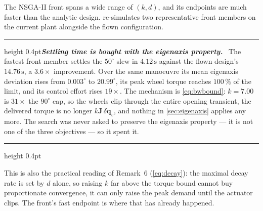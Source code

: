 \documentclass[conference,10pt,a4paper]{IEEEtran}
\newcommand{\remarkrule}{\par\nobreak\vspace{2pt}%
  \hrule height 0.4pt\vspace{4pt}\nobreak}
\newenvironment{keybox}[1][Result]
  {\par\medskip\remarkrule\noindent\small\textbf{\textit{#1.}}\ \ignorespaces}
  {\par\vspace{3pt}\hrule height 0.4pt\par\medskip\ignorespacesafterend}
\newcommand{\vect}[1]{\bm{#1}}
\newcommand{\mat}[1]{\bm{#1}}
\newcommand{\unit}[1]{\ensuremath{\,\mathrm{#1}}}
\begin{document}
The NSGA-II front spans a wide range of $(k,d)$, and its endpoints are much
faster than the analytic design.  re-simulates two
representative front members on the current plant alongside the flown
configuration.

\begin{keybox}[Settling time is bought with the eigenaxis property]
The fastest front member settles the $50^\circ$ slew in $4.12\unit{s}$ against
the flown design's $14.76\unit{s}$, a $3.6\times$ improvement. Over the same
manoeuvre its mean eigenaxis deviation rises from $0.003^\circ$ to
$20.99^\circ$, its peak wheel torque reaches $100\,\%$ of the limit, and its
control effort rises $19\times$. The mechanism is
\cref{eq:bwbound}: $k=7.00$ is $31\times$ the $90^\circ$ cap, so the wheels
clip through the entire opening transient, the delivered torque is no longer
$k\mat{J}\,\delta\vect{q}_v$, and nothing in \cref{sec:eigenaxis} applies any
more. The search was never asked to preserve the eigenaxis property --- it is
not one of the three objectives --- so it spent it.
\end{keybox}

This is also the practical reading of Remark~6 (\cref{eq:decay}): the maximal
decay rate is set by $d$ alone, so raising $k$ far above the torque bound
cannot buy proportionate convergence, it can only raise the peak demand until
the actuator clips. The front's fast endpoint is where that has already
happened.
\end{document}

